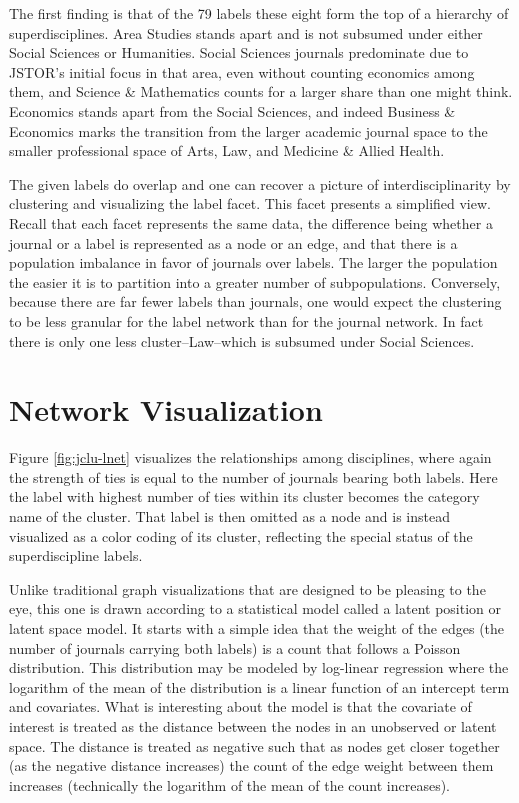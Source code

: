 \documentclass[]{book}
\theoremstyle{definition}
\theoremstyle{definition}
\theoremstyle{definition}
\theoremstyle{remark}
\begin{document}
The first finding is that of the 79 labels these eight form the top of a
hierarchy of superdisciplines. Area Studies stands apart and is not
subsumed under either Social Sciences or Humanities. Social Sciences
journals predominate due to JSTOR's initial focus in that area, even
without counting economics among them, and Science \& Mathematics counts
for a larger share than one might think. Economics stands apart from the
Social Sciences, and indeed Business \& Economics marks the transition
from the larger academic journal space to the smaller professional space
of Arts, Law, and Medicine \& Allied Health.

The given labels do overlap and one can recover a picture of
interdisciplinarity by clustering and visualizing the label facet. This
facet presents a simplified view. Recall that each facet represents the
same data, the difference being whether a journal or a label is
represented as a node or an edge, and that there is a population
imbalance in favor of journals over labels. The larger the population
the easier it is to partition into a greater number of subpopulations.
Conversely, because there are far fewer labels than journals, one would
expect the clustering to be less granular for the label network than for
the journal network. In fact there is only one less cluster--Law--which
is subsumed under Social Sciences.

\hypertarget{network-visualization}{%
\section{Network Visualization}\label{network-visualization}}

Figure \ref{fig:jclu-lnet} visualizes the relationships among
disciplines, where again the strength of ties is equal to the number of
journals bearing both labels. Here the label with highest number of ties
within its cluster becomes the category name of the cluster. That label
is then omitted as a node and is instead visualized as a color coding of
its cluster, reflecting the special status of the superdiscipline
labels.

Unlike traditional graph visualizations that are designed to be pleasing
to the eye, this one is drawn according to a statistical model called a
latent position or latent space model. It starts with a simple idea that
the weight of the edges (the number of journals carrying both labels) is
a count that follows a Poisson distribution. This distribution may be
modeled by log-linear regression where the logarithm of the mean of the
distribution is a linear function of an intercept term and covariates.
What is interesting about the model is that the covariate of interest is
treated as the distance between the nodes in an unobserved or latent
space. The distance is treated as negative such that as nodes get closer
together (as the negative distance increases) the count of the edge
weight between them increases (technically the logarithm of the mean of
the count increases).
\end{document}
